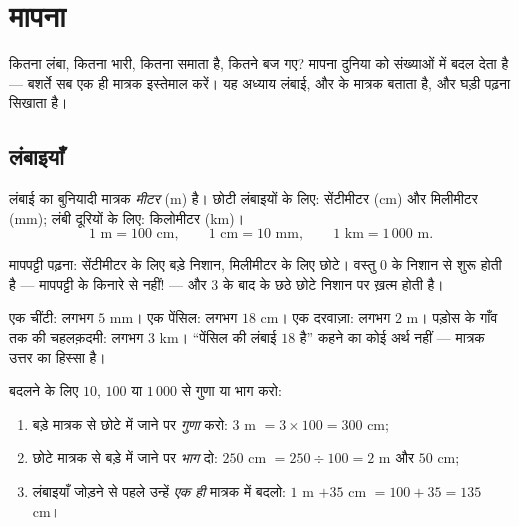 \chapter{मापना}\label{ch:g3:measure}

कितना लंबा, कितना भारी, कितना समाता है, कितने बज गए? मापना
दुनिया को संख्याओं में बदल देता है --- बशर्ते सब एक ही मात्रक
इस्तेमाल करें। यह अध्याय लंबाई,  और  के मात्रक
बताता है, और घड़ी पढ़ना सिखाता है।

\section{लंबाइयाँ}

\begin{definition}[लंबाई के मात्रक]\label{def:g3:measure:length}
लंबाई का बुनियादी मात्रक \emph{मीटर} (m) है। छोटी लंबाइयों के
लिए: सेंटीमीटर (cm) और मिलीमीटर (mm); लंबी दूरियों के लिए:
किलोमीटर (km)।
\[
1 \text{ m} = 100 \text{ cm}, \qquad
1 \text{ cm} = 10 \text{ mm}, \qquad
1 \text{ km} = 1\,000 \text{ m}.
\]
\end{definition}

\begin{omfigure}

{\small मापपट्टी पढ़ना: सेंटीमीटर के लिए बड़े निशान, मिलीमीटर के
लिए छोटे। वस्तु $0$ के निशान से शुरू होती है --- मापपट्टी के
किनारे से नहीं! --- और $3$ के बाद के छठे छोटे निशान पर ख़त्म होती है।}
\end{omfigure}

\begin{example}[सही मात्रक चुनना]\label{ex:g3:measure:choose}
एक चींटी: लगभग $5$ mm। एक पेंसिल: लगभग $18$ cm। एक दरवाज़ा:
लगभग $2$ m। पड़ोस के गाँव तक की चहलक़दमी: लगभग $3$ km।
``पेंसिल की लंबाई $18$ है'' कहने का कोई अर्थ नहीं --- मात्रक उत्तर का हिस्सा है।
\end{example}

\begin{method}[मात्रक बदलना]\label{met:g3:measure:convert}
बदलने के लिए $10$, $100$ या $1\,000$ से गुणा या भाग करो:
\begin{enumerate}
  \item बड़े मात्रक से छोटे में जाने पर \emph{गुणा} करो:
        $3$ m $= 3 \times 100 = 300$ cm;
  \item छोटे मात्रक से बड़े में जाने पर \emph{भाग} दो:
        $250$ cm $= 250 \div 100 = 2$ m और $50$ cm;
  \item लंबाइयाँ जोड़ने से पहले उन्हें \emph{एक ही} मात्रक में बदलो:
        $1$ m $+ 35$ cm $= 100 + 35 = 135$ cm।
\end{enumerate}
\end{method}

